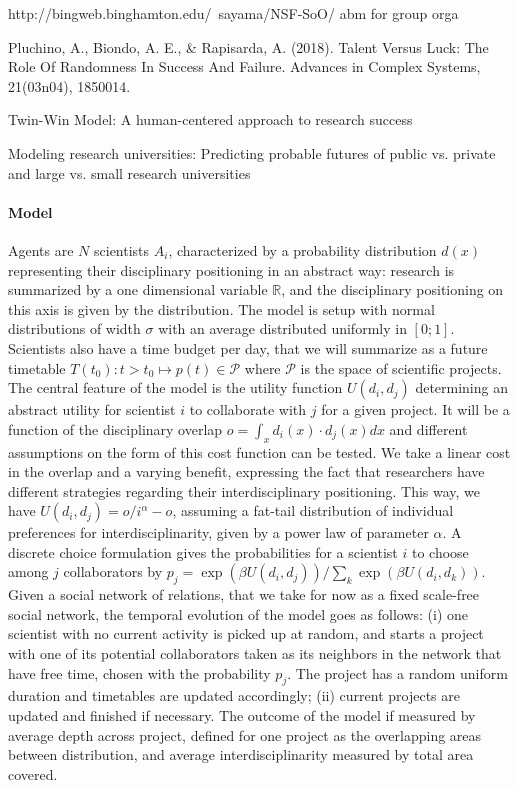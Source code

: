 http://bingweb.binghamton.edu/~sayama/NSF-SoO/ abm for group orga

Pluchino, A., Biondo, A. E., \& Rapisarda, A. (2018). Talent Versus Luck: The Role Of Randomness In Success And Failure. Advances in Complex Systems, 21(03n04), 1850014.

Twin-Win Model: A human-centered approach to research success

Modeling research universities: Predicting probable futures of public vs. private and large vs. small research universities

\paragraph{Model}

Agents are $N$ scientists $A_i$, characterized by a probability distribution $d(x)$ representing their disciplinary positioning in an abstract way: research is summarized by a one dimensional variable $\mathbb{R}$, and the disciplinary positioning on this axis is given by the distribution. The model is setup with normal distributions of width $\sigma$ with an average distributed uniformly in $\left[0;1\right]$. Scientists also have a time budget per day, that we will summarize as a future timetable $T(t_0):t>t_0 \mapsto p(t) \in \mathcal{P}$ where $\mathcal{P}$ is the space of scientific projects. The central feature of the model is the utility function $U(d_i,d_j)$ determining an abstract utility for scientist $i$ to collaborate with $j$ for a given project. It will be a function of the disciplinary overlap $o = \int_x d_i(x)\cdot d_j(x) dx$ and different assumptions on the form of this cost function can be tested. We take a linear cost in the overlap and a varying benefit, expressing the fact that researchers have different strategies regarding their interdisciplinary positioning. This way, we have $U(d_i,d_j) = o / i^\alpha - o$, assuming a fat-tail distribution of individual preferences for interdisciplinarity, given by a power law of parameter $\alpha$. A discrete choice formulation gives the probabilities for a scientist $i$ to choose among $j$ collaborators by $p_j = \exp\left(\beta U(d_i,d_j) \right)/\sum_k \exp\left(\beta U(d_i,d_k) \right)$. Given a social network of relations, that we take for now as a fixed scale-free social network, the temporal evolution of the model goes as follows: (i) one scientist with no current activity is picked up at random, and starts a project with one of its potential collaborators taken as its neighbors in the network that have free time, chosen with the probability $p_j$. The project has a random uniform duration and timetables are updated accordingly; (ii) current projects are updated and finished if necessary. The outcome of the model if measured by average depth across project, defined for one project as the overlapping areas between distribution, and average interdisciplinarity measured by total area covered.


